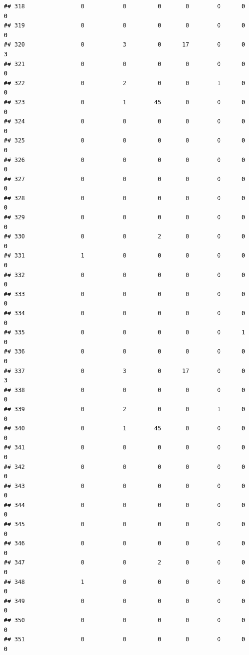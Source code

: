 \documentclass[
]{article}
\begin{document}
\begin{verbatim}
## 318                0           0         0       0        0      0      0
## 319                0           0         0       0        0      0      0
## 320                0           3         0      17        0      0      3
## 321                0           0         0       0        0      0      0
## 322                0           2         0       0        1      0      0
## 323                0           1        45       0        0      0      0
## 324                0           0         0       0        0      0      0
## 325                0           0         0       0        0      0      0
## 326                0           0         0       0        0      0      0
## 327                0           0         0       0        0      0      0
## 328                0           0         0       0        0      0      0
## 329                0           0         0       0        0      0      0
## 330                0           0         2       0        0      0      0
## 331                1           0         0       0        0      0      0
## 332                0           0         0       0        0      0      0
## 333                0           0         0       0        0      0      0
## 334                0           0         0       0        0      0      0
## 335                0           0         0       0        0      1      0
## 336                0           0         0       0        0      0      0
## 337                0           3         0      17        0      0      3
## 338                0           0         0       0        0      0      0
## 339                0           2         0       0        1      0      0
## 340                0           1        45       0        0      0      0
## 341                0           0         0       0        0      0      0
## 342                0           0         0       0        0      0      0
## 343                0           0         0       0        0      0      0
## 344                0           0         0       0        0      0      0
## 345                0           0         0       0        0      0      0
## 346                0           0         0       0        0      0      0
## 347                0           0         2       0        0      0      0
## 348                1           0         0       0        0      0      0
## 349                0           0         0       0        0      0      0
## 350                0           0         0       0        0      0      0
## 351                0           0         0       0        0      0      0

\end{verbatim}
\end{document}
